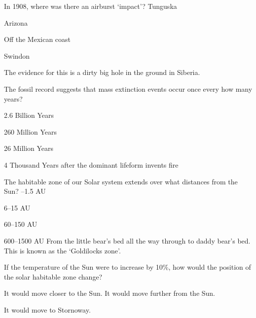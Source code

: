 \documentclass[compose]{exam-n}
\begin{document}
\begin{mcq}
In 1908, where was there an airburst `impact'?
\answer Tunguska
\item Arizona
\item Off the Mexican coast
\item Swindon
\begin{solution}
The evidence for this is a dirty big hole in the ground in Siberia.
\end{solution}
\end{mcq}

\begin{mcq}
The fossil record suggests that mass extinction events occur once every how many years?
\item 2.6 Billion Years
\item 260 Million Years
\item 26 Million Years %
\item 4 Thousand Years after the dominant lifeform invents fire
\end{mcq}

\begin{mcq}
The habitable zone of our Solar system extends over what distances from the Sun?
--1.5 AU
\item 6--15 AU
\item 60--150 AU
\item 600--1500 AU
\answer From the little bear's bed all the way through to daddy bear's
  bed.  This is known as the `Goldilocks zone'.
\end{mcq}

\begin{mcq}
If the temperature of the Sun were to increase by 10\%, how would the
position of the solar habitable zone change?
\item It would move closer to the Sun.
\answer It would move further from the Sun.
\item It would move to Stornoway.
\end{mcq}
\end{document}
